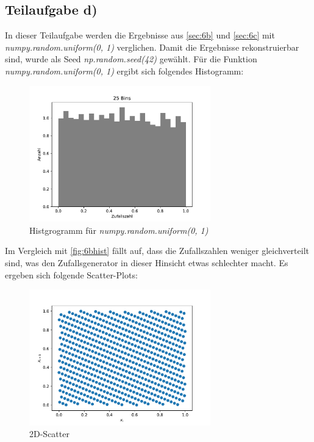 \subsection{Teilaufgabe d)}
In dieser Teilaufgabe werden die Ergebnisse aus \ref{sec:6b} und \ref{sec:6c} mit \textit{numpy.random.uniform(0, 1)} verglichen.
Damit die Ergebnisse rekonstruierbar sind, wurde als Seed \textit{np.random.seed(42)} gewählt.
Für die Funktion \textit{numpy.random.uniform(0, 1)} ergibt sich folgendes Histogramm:
\begin{figure}[H]
  \centering
  \includegraphics[width=0.7\textwidth]{Aufgabe06/Teilaufgabe_d)_Histogramm.pdf}
  \caption{Histgrogramm für \textit{numpy.random.uniform(0, 1)}}
  \label{6dhist}
\end{figure}
Im Vergleich mit \ref{fig:6bhist} fällt auf, dass die Zufallszahlen weniger gleichverteilt sind, was den Zufallsgenerator in dieser Hinsicht etwas schlechter macht.
Es ergeben sich folgende Scatter-Plots:
\begin{figure}[H]
  \centering
  \includegraphics[width=0.7\textwidth]{Aufgabe06/Teilaufgabe_c)_2D-Scatter.pdf}
  \caption{2D-Scatter}
  \label{fig:2dscatterc}
\end{figure}


